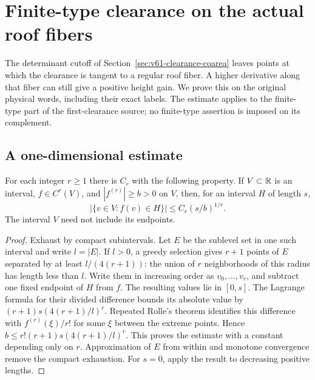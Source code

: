\section{Finite-type clearance on the actual roof fibers}
\label{sec:v62-finite-type-clearance}
The determinant cutoff of Section~\ref{sec:v61-clearance-coarea} leaves
points at which the clearance is tangent to a regular roof fiber. A
higher derivative along that fiber can still give a positive height
gain. We prove this on the original physical words, including their
exact labels. The estimate applies to the finite-type part of the
first-clearance source; no finite-type assertion is imposed on its
complement.

\subsection{A one-dimensional estimate}
\begin{lemma}\label{lem:v62-sublevel}
For each integer $r\ge1$ there is $C_r$ with the following property.
If $V\subset\mathbb R$ is an interval, $f\in C^r(V)$, and
$|f^{(r)}|\ge b>0$ on $V$, then, for an interval $H$ of length $s$,
\begin{equation}\label{eq:v62-sublevel}
 |\{v\in V:f(v)\in H\}|\le C_r(s/b)^{1/r}.
\end{equation}
The interval $V$ need not include its endpoints.
\end{lemma}
\begin{proof}
Exhaust by compact subintervals. Let $E$ be the sublevel set in one
such interval and write $l=|E|$. If $l>0$, a greedy selection gives
$r+1$ points of $E$ separated by at least $l/(4(r+1))$: the union of
$r$ neighborhoods of this radius has length less than $l$. Write
them in increasing order as $v_0,\ldots,v_r$, and subtract one fixed
endpoint of $H$ from $f$. The resulting values lie in $[0,s]$.
The Lagrange formula for their divided difference bounds its absolute
value by
$(r+1)s(4(r+1)/l)^r$. Repeated Rolle's theorem identifies this
difference with $f^{(r)}(\xi)/r!$ for some $\xi$ between the extreme
points. Hence
$b\le r!(r+1)s(4(r+1)/l)^r$.
This proves the estimate with a constant depending only on $r$.
Approximation of $E$ from within and monotone convergence remove the
compact exhaustion. For $s=0$, apply the result to decreasing positive
lengths.
\end{proof}

